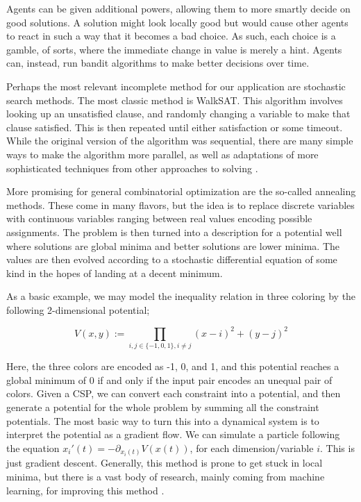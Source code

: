 Agents can be given additional powers, allowing them to more smartly decide on good solutions. A solution might look locally good but would cause other agents to react in such a way that it becomes a bad choice. As such, each choice is a gamble, of sorts, where the immediate change in value is merely a hint. Agents can, instead, run bandit algorithms \citep{lattimore2020bandit} to make better decisions over time.

Perhaps the most relevant incomplete method for our application are stochastic search methods. The most classic method is WalkSAT. This algorithm involves looking up an unsatisfied clause, and randomly changing a variable to make that clause satisfied. This is then repeated until either satisfaction or some timeout. While the original version of the algorithm was sequential, there are many simple ways to make the algorithm more parallel, as well as adaptations of more sophisticated techniques from other approaches to solving \citep{mcdonald2009parallel}.

More promising for general combinatorial optimization are the so-called annealing methods. These come in many flavors, but the idea is to replace discrete variables with continuous variables ranging between real values encoding possible assignments. The problem is then turned into a description for a potential well where solutions are global minima and better solutions are lower minima. The values are then evolved according to a stochastic differential equation of some kind in the hopes of landing at a decent minimum.

As a basic example, we may model the inequality relation in three coloring by the following 2-dimensional potential;

\begin{equation}
    V(x, y) := \prod_{i, j \in \{-1, 0, 1\}, i \neq j} (x - i)^2 + (y - j)^2
\end{equation}

Here, the three colors are encoded as -1, 0, and 1, and this potential reaches a global minimum of 0 if and only if the input pair encodes an unequal pair of colors. Given a CSP, we can convert each constraint into a potential, and then generate a potential for the whole problem by summing all the constraint potentials. The most basic way to turn this into a dynamical system is to interpret the potential as a gradient flow. We can simulate a particle following the equation $x_i'(t) = -\partial_{x_i(t)} V(x(t))$, for each dimension/variable $i$. This is just gradient descent. Generally, this method is prone to get stuck in local minima, but there is a vast body of research, mainly coming from machine learning, for improving this method \citep{ruder2016overview}.

